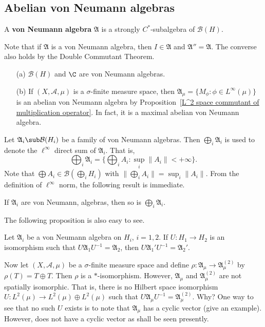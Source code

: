 \subsection{Abelian von Neumann algebras}
\begin{definition}
A \textbf{von Neumann algebra} $\mathfrak{A}$ is a strongly $C^*$-subalgebra of $\mathcal{B}(H)$.
\end{definition}
Note that if $\mathfrak{A}$ is a von Neumann algebra, then $I\in\mathfrak{A}$ and $\mathfrak{A}''=\mathfrak{A}$. The converse also holds by the Double Commutant Theorem.
\begin{example}
\mbox{}
\begin{itemize}
\item[(a)] $\mathcal{B}(H)$ and $\C$ are von Neumann algebras.
\item[(b)] If $(X,\mathcal{A},\mu)$ is a $\sigma$-finite measure space, then $\mathfrak{A}_\mu=\{M_\phi:\phi\in L^\infty(\mu)\}$ is an abelian von Neumann algebra by Proposition~\ref{L^2 space commutant of multiplication operator}. In fact, it is a maximal abelian von Neumann algebra.
\end{itemize}
\end{example}
Let $\mathfrak{A}_i\sub\mathcal{B}(H_i)$ be a family of von Neumann algebras. Then $\bigoplus_i\mathfrak{A}_i$ is used to denote the $\ell^\infty$ direct sum of $\mathfrak{A}_i$. That is,
\[\bigoplus_i\mathfrak{A}_i=\{\bigoplus_iA_i:\sup_i\|A_i\|<+\infty\}.\]
Note that $\bigoplus A_i\in\mathcal{B}(\bigoplus_iH_i)$ with $\|\bigoplus_iA_i\|=\sup_i\|A_i\|$. From the definition of $\ell^\infty$ norm, the following result is immediate.
\begin{proposition}
If $\mathfrak{A}_i$ are von Neumann, algebras, then so is $\bigoplus_i\mathfrak{A}_i$.
\end{proposition}
The following proposition is also easy to see.
\begin{proposition}
Let $\mathfrak{A}_i$ be a von Neumann algebra on $H_i$, $i=1,2$. If $U:H_1\to H_2$ is an isomorphism such that $U\mathfrak{A}_1U^{-1}=\mathfrak{A}_2$, then $U\mathfrak{A}_1'U^{-1}=\mathfrak{A}_2'$.
\end{proposition}
Now let $(X,\mathcal{A},\mu)$ be a $\sigma$-finite measure space and define $\rho:\mathfrak{A}_\mu\to\mathfrak{A}_\mu^{(2)}$ by $\rho(T)=T\oplus T$. Then $\rho$ is a $*$-isomorphism. However, $\mathfrak{A}_\mu$ and $\mathfrak{A}_{\mu}^{(2)}$ are not spatially isomorphic. That is, there is no Hilbert space isomorphism $U:L^2(\mu)\to L^2(\mu)\oplus L^2(\mu)$ such that $U\mathfrak{A}_\mu U^{-1}=\mathfrak{A}_\mu^{(2)}$. Why? One way to see that no such $U$ exists is to note that $\mathfrak{A}_\mu$ has a cyclic vector (give an example). However,  does not have a cyclic vector as shall be seen presently.
